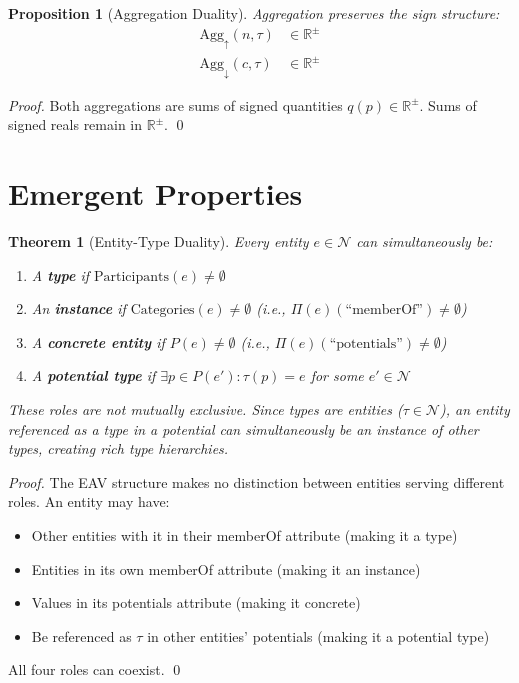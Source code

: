 \documentclass[11pt]{article}
\newtheorem{theorem}{Theorem}
\newtheorem{proposition}{Proposition}
\begin{document}
\begin{proposition}[Aggregation Duality]
Aggregation preserves the sign structure:
\begin{align}
\text{Agg}_\uparrow(n, \tau) &\in \mathbb{R}^\pm \\
\text{Agg}_\downarrow(c, \tau) &\in \mathbb{R}^\pm
\end{align}
\end{proposition}

\begin{proof}
Both aggregations are sums of signed quantities $q(p) \in \mathbb{R}^\pm$. Sums of signed reals remain in $\mathbb{R}^\pm$. \qed
\end{proof}

\section{Emergent Properties}

\begin{theorem}[Entity-Type Duality]
Every entity $e \in \mathcal{N}$ can simultaneously be:
\begin{enumerate}
\item A \textbf{type} if $\text{Participants}(e) \neq \emptyset$
\item An \textbf{instance} if $\text{Categories}(e) \neq \emptyset$ (i.e., $\Pi(e)(\text{``memberOf''}) \neq \emptyset$)
\item A \textbf{concrete entity} if $P(e) \neq \emptyset$ (i.e., $\Pi(e)(\text{``potentials''}) \neq \emptyset$)
\item A \textbf{potential type} if $\exists p \in P(e'): \tau(p) = e$ for some $e' \in \mathcal{N}$
\end{enumerate}
These roles are not mutually exclusive. Since types are entities ($\tau \in \mathcal{N}$), an entity referenced as a type in a potential can simultaneously be an instance of other types, creating rich type hierarchies.
\end{theorem}

\begin{proof}
The EAV structure makes no distinction between entities serving different roles. An entity may have:
\begin{itemize}
\item Other entities with it in their memberOf attribute (making it a type)
\item Entities in its own memberOf attribute (making it an instance)
\item Values in its potentials attribute (making it concrete)
\item Be referenced as $\tau$ in other entities' potentials (making it a potential type)
\end{itemize}
All four roles can coexist. \qed
\end{proof}
\end{document}
